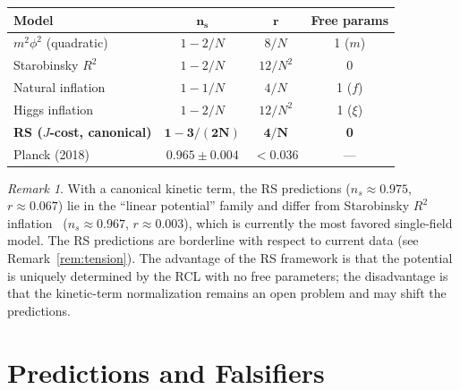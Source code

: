 \documentclass[12pt,a4paper]{article}
\theoremstyle{definition}
\theoremstyle{remark}
\newtheorem{remark}[theorem]{Remark}
\begin{document}
\begin{center}
\renewcommand{\arraystretch}{1.3}
\begin{tabular}{@{}lccc@{}}
\toprule
\textbf{Model} & $\boldsymbol{n_s}$ &
$\boldsymbol{r}$ & \textbf{Free params} \\
\midrule
$m^2\phi^2$ (quadratic) & $1 - 2/N$ & $8/N$ & 1 ($m$) \\
Starobinsky $R^2$ & $1 - 2/N$ & $12/N^2$ & 0 \\
Natural inflation & $1 - 1/N$ & $4/N$ & 1 ($f$) \\
Higgs inflation & $1 - 2/N$ & $12/N^2$ & 1 ($\xi$) \\
\textbf{RS ($J$-cost, canonical)} & $\boldsymbol{1 - 3/(2N)}$
& $\boldsymbol{4/N}$ & \textbf{0} \\
\midrule
Planck (2018) & $0.965 \pm 0.004$ & $< 0.036$ & --- \\
\bottomrule
\end{tabular}
\end{center}

\begin{remark}
With a canonical kinetic term, the RS predictions
($n_s \approx 0.975$, $r \approx 0.067$) lie in the
``linear potential'' family and differ from
Starobinsky $R^2$ inflation~\cite{Starobinsky1980}
($n_s \approx 0.967$, $r \approx 0.003$), which is
currently the most favored single-field model.  The
RS predictions are borderline with respect to current
data (see Remark~\ref{rem:tension}).  The advantage
of the RS framework is that the potential is uniquely
determined by the RCL with no free parameters; the
disadvantage is that the kinetic-term normalization
remains an open problem and may shift the predictions.
\end{remark}

\section{Predictions and Falsifiers}
\label{sec:predictions}
\end{document}

